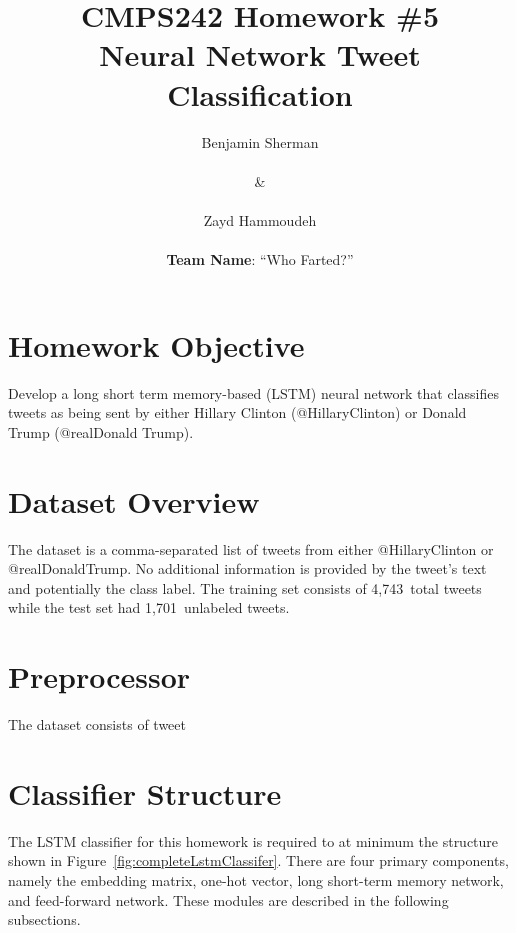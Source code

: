 \documentclass{report}
\title{\textbf{CMPS242 Homework \#5 \textendash{} \\Neural Network Tweet Classification}}
\author{Benjamin Sherman \\~\\ \& \\~\\ Zayd Hammoudeh \\~\\ \textbf{Team Name}: ``Who Farted?''}
\date{} %
\begin{document}
  \maketitle
  
  \suppressfloats %
  \section{Homework Objective}
  
  Develop a long short term memory-based (LSTM) neural network that classifies tweets as being sent by either Hillary Clinton (@HillaryClinton) or Donald Trump (@realDonald Trump).
  
  \section{Dataset Overview}
  
  The dataset is a comma-separated list of tweets from either @HillaryClinton or @realDonaldTrump.  No additional information is provided by the tweet's text and potentially the class label.  The training set consists of 4,743~total tweets while the test set had 1,701~unlabeled tweets.
   
  \section{Preprocessor}
  
  The dataset consists of tweet 
  
  \section{Classifier Structure}
  
  The LSTM classifier for this homework is required to at minimum the structure shown in Figure~\ref{fig:completeLstmClassifer}.  There are four primary components, namely the embedding matrix, one-hot vector, long short-term memory network, and feed-forward network.  These modules are described in the following subsections.
  
\end{document}
